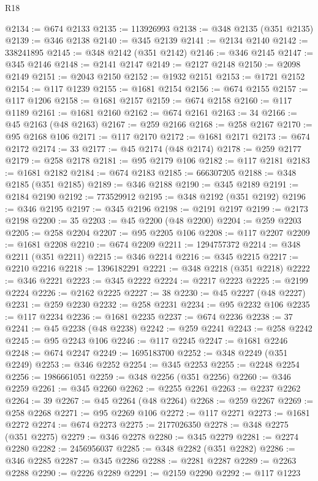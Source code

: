 \begin{lexlean}{R18}
\begin{coremodule}
@2134 := @674 @2133
@2135 := 113926993
@2138 := @348 @2135 (@351 @2135)
@2139 := @346 @2138
@2140 := @345 @2139
@2141 := @2134 @2140
@2142 := 338241895
@2145 := @348 @2142 (@351 @2142)
@2146 := @346 @2145
@2147 := @345 @2146
@2148 := @2141 @2147
@2149 := @2127 @2148
@2150 := @2098 @2149
@2151 := @2043 @2150
@2152 := @1932 @2151
@2153 := @1721 @2152
@2154 := @117 @1239
@2155 := @1681 @2154
@2156 := @674 @2155
@2157 := @117 @1206
@2158 := @1681 @2157
@2159 := @674 @2158
@2160 := @117 @1189
@2161 := @1681 @2160
@2162 := @674 @2161
@2163 := 34
@2166 := @45 @2163 (@48 @2163)
@2167 := @259 @2166
@2168 := @258 @2167
@2170 := @95 @2168 @106
@2171 := @117 @2170
@2172 := @1681 @2171
@2173 := @674 @2172
@2174 := 33
@2177 := @45 @2174 (@48 @2174)
@2178 := @259 @2177
@2179 := @258 @2178
@2181 := @95 @2179 @106
@2182 := @117 @2181
@2183 := @1681 @2182
@2184 := @674 @2183
@2185 := 666307205
@2188 := @348 @2185 (@351 @2185)
@2189 := @346 @2188
@2190 := @345 @2189
@2191 := @2184 @2190
@2192 := 773529912
@2195 := @348 @2192 (@351 @2192)
@2196 := @346 @2195
@2197 := @345 @2196
@2198 := @2191 @2197
@2199 := @2173 @2198
@2200 := 35
@2203 := @45 @2200 (@48 @2200)
@2204 := @259 @2203
@2205 := @258 @2204
@2207 := @95 @2205 @106
@2208 := @117 @2207
@2209 := @1681 @2208
@2210 := @674 @2209
@2211 := 1294757372
@2214 := @348 @2211 (@351 @2211)
@2215 := @346 @2214
@2216 := @345 @2215
@2217 := @2210 @2216
@2218 := 1396182291
@2221 := @348 @2218 (@351 @2218)
@2222 := @346 @2221
@2223 := @345 @2222
@2224 := @2217 @2223
@2225 := @2199 @2224
@2226 := @2162 @2225
@2227 := 38
@2230 := @45 @2227 (@48 @2227)
@2231 := @259 @2230
@2232 := @258 @2231
@2234 := @95 @2232 @106
@2235 := @117 @2234
@2236 := @1681 @2235
@2237 := @674 @2236
@2238 := 37
@2241 := @45 @2238 (@48 @2238)
@2242 := @259 @2241
@2243 := @258 @2242
@2245 := @95 @2243 @106
@2246 := @117 @2245
@2247 := @1681 @2246
@2248 := @674 @2247
@2249 := 1695183700
@2252 := @348 @2249 (@351 @2249)
@2253 := @346 @2252
@2254 := @345 @2253
@2255 := @2248 @2254
@2256 := 1986661051
@2259 := @348 @2256 (@351 @2256)
@2260 := @346 @2259
@2261 := @345 @2260
@2262 := @2255 @2261
@2263 := @2237 @2262
@2264 := 39
@2267 := @45 @2264 (@48 @2264)
@2268 := @259 @2267
@2269 := @258 @2268
@2271 := @95 @2269 @106
@2272 := @117 @2271
@2273 := @1681 @2272
@2274 := @674 @2273
@2275 := 2177026350
@2278 := @348 @2275 (@351 @2275)
@2279 := @346 @2278
@2280 := @345 @2279
@2281 := @2274 @2280
@2282 := 2456956037
@2285 := @348 @2282 (@351 @2282)
@2286 := @346 @2285
@2287 := @345 @2286
@2288 := @2281 @2287
@2289 := @2263 @2288
@2290 := @2226 @2289
@2291 := @2159 @2290
@2292 := @117 @1223

\end{coremodule}
\end{lexlean}
